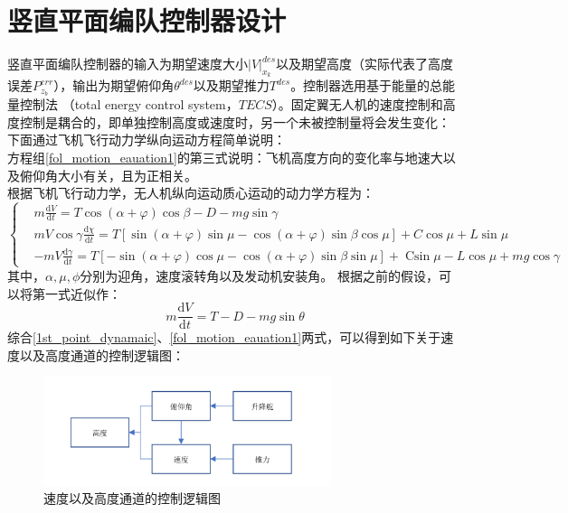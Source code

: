 \section{竖直平面编队控制器设计}
竖直平面编队控制器的输入为期望速度大小$|V|_{x_k}^{des}$以及期望高度（实际代表了高度误差$P_{z_b}^{err}$），输出为期望俯仰角$\theta^{des}$以及期望推力$T^{des}$。控制器选用基于能量的总能量控制法
（total energy control system，$TECS$）。固定翼无人机的速度控制和高度控制是耦合的，即单独控制高度或速度时，另一个未被控制量将会发生变化：
下面通过飞机飞行动力学纵向运动方程简单说明：
\\方程组\ref{fol_motion_eauation1}的第三式说明：飞机高度方向的变化率与地速大以及俯仰角大小有关，且为正相关。
\\根据飞机飞行动力学，无人机纵向运动质心运动的动力学方程为：
\begin{equation}
    \left\{
    \begin{aligned}
    &m \frac{\mathrm{d} V}{\mathrm{d} t}=T \cos (\alpha+\varphi) \cos \beta-D-m g \sin \gamma\\
    &m V \cos \gamma \frac{\mathrm{d} \chi}{\mathrm{d} t}=T[\sin (\alpha+\varphi) \sin \mu-\cos (\alpha+\varphi) \sin \beta \cos \mu]+C \cos \mu+L \sin \mu\\
    &-m V \frac{\mathrm{d} \gamma}{\mathrm{d} t}=T[-\sin (\alpha+\varphi) \cos \mu-\cos (\alpha+\varphi) \sin \beta \sin \mu]+\operatorname{Csin} \mu-L \cos \mu+m g \cos \gamma
    \end{aligned}
    \right .
    \label{point_dynamaic}
\end{equation}
其中，$\alpha,\mu,\phi$分别为迎角，速度滚转角以及发动机安装角。
根据之前的假设，可以将第一式近似作：
\begin{equation}
    m \frac{\mathrm{d} V}{\mathrm{d} t}=T-D-m g \sin \theta
    \label{1st_point_dynamaic}
\end{equation}
综合\ref{1st_point_dynamaic}、\ref{fol_motion_eauation1}两式，可以得到如下关于速度以及高度通道的控制逻辑图：
\begin{figure}[H]
    \centering
    \includegraphics[width=0.75\textwidth]{figures/c3/relation_theta_thrust}
    \caption{速度以及高度通道的控制逻辑图}\label{fig:relation_theta_thrust}
\end{figure}
